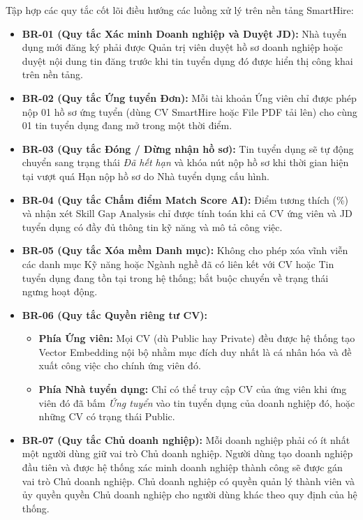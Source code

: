 Tập hợp các quy tắc cốt lõi điều hướng các luồng xử lý trên nền tảng SmartHire:

\begin{itemize}
    \item \textbf{BR-01 (Quy tắc Xác minh Doanh nghiệp và Duyệt JD):} Nhà tuyển dụng mới đăng ký phải được Quản trị viên duyệt hồ sơ doanh nghiệp hoặc duyệt nội dung tin đăng trước khi tin tuyển dụng đó được hiển thị công khai trên nền tảng.
    \item \textbf{BR-02 (Quy tắc Ứng tuyển Đơn):} Mỗi tài khoản Ứng viên chỉ được phép nộp 01 hồ sơ ứng tuyển (dùng CV SmartHire hoặc File PDF tải lên) cho cùng 01 tin tuyển dụng đang mở trong một thời điểm.
    \item \textbf{BR-03 (Quy tắc Đóng / Dừng nhận hồ sơ):} Tin tuyển dụng sẽ tự động chuyển sang trạng thái \textit{Đã hết hạn} và khóa nút nộp hồ sơ khi thời gian hiện tại vượt quá Hạn nộp hồ sơ do Nhà tuyển dụng cấu hình.
    \item \textbf{BR-04 (Quy tắc Chấm điểm Match Score AI):} Điểm tương thích (\%) và nhận xét Skill Gap Analysis chỉ được tính toán khi cả CV ứng viên và JD tuyển dụng có đầy đủ thông tin kỹ năng và mô tả công việc.
    \item \textbf{BR-05 (Quy tắc Xóa mềm Danh mục):} Không cho phép xóa vĩnh viễn các danh mục Kỹ năng hoặc Ngành nghề đã có liên kết với CV hoặc Tin tuyển dụng đang tồn tại trong hệ thống; bắt buộc chuyển về trạng thái ngưng hoạt động.
    \item \textbf{BR-06 (Quy tắc Quyền riêng tư CV):}
    \begin{itemize}
        \item \textbf{Phía Ứng viên:} Mọi CV (dù Public hay Private) đều được hệ thống tạo Vector Embedding nội bộ nhằm mục đích duy nhất là cá nhân hóa và đề xuất công việc cho chính ứng viên đó.
        \item \textbf{Phía Nhà tuyển dụng:} Chỉ có thể truy cập CV của ứng viên khi ứng viên đó đã bấm \textit{Ứng tuyển} vào tin tuyển dụng của doanh nghiệp đó, hoặc những CV có trạng thái Public.
    \end{itemize}
    \item \textbf{BR-07 (Quy tắc Chủ doanh nghiệp):} Mỗi doanh nghiệp phải có ít nhất một người dùng giữ vai trò Chủ doanh nghiệp. Người dùng tạo doanh nghiệp đầu tiên và được hệ thống xác minh doanh nghiệp thành công sẽ được gán vai trò Chủ doanh nghiệp. Chủ doanh nghiệp có quyền quản lý thành viên và ủy quyền quyền Chủ doanh nghiệp cho người dùng khác theo quy định của hệ thống.
\end{itemize}

\clearpage
